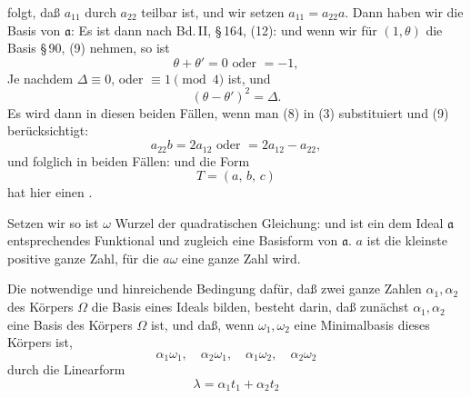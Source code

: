folgt, daß $a_{11}$ durch $a_{22}$ teilbar ist, und wir setzen $a_{11} = a_{22}a$.
Dann haben wir die Basis von $\mathfrak{a}$:
Es ist dann nach Bd.\,II, §\,164, (12):
und wenn wir für $(1, \theta)$ die Basis §\,90, (9) nehmen, so ist
\[
\theta + \theta' = 0 \text{ oder } = -1,
\]
Je nachdem $\Delta \equiv 0$, oder $\equiv 1 \pmod 4$ ist, und
\[
(\theta - \theta')^2 = \Delta.
\]
Es wird dann in diesen beiden Fällen, wenn man (8) in (3)
substituiert und (9) berücksichtigt:
\[
a_{22}b = 2a_{12} \text{ oder } = 2a_{12} - a_{22},
\]
und folglich in beiden Fällen:
und die Form
\[
T = (a,\,b,\,c)
\]
hat hier einen .

Setzen wir
so ist $\omega$ Wurzel der quadratischen Gleichung:
und
ist ein dem Ideal $\mathfrak{a}$ entsprechendes Funktional und zugleich eine
Basisform von $\mathfrak{a}$. $a$ ist die kleinste positive ganze Zahl, für die
$a\omega$ eine ganze Zahl wird.

Die notwendige und hinreichende Bedingung dafür, daß zwei
ganze Zahlen $\alpha_1, \alpha_2$ des Körpers $\Omega$ die Basis eines Ideals bilden,
besteht darin, daß zunächst $\alpha_1, \alpha_2$ eine Basis des Körpers $\Omega$ ist,
und daß, wenn $\omega_1, \omega_2$ eine Minimalbasis dieses Körpers ist,
\[
\alpha_1\omega_1,\quad \alpha_2\omega_1,\quad \alpha_1\omega_2,\quad \alpha_2\omega_2
\]
durch die Linearform
\[
\lambda = \alpha_1 t_1 + \alpha_2 t_2
\]
